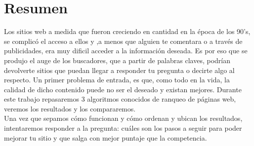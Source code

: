 \section{Resumen}

Los sitios web a medida que fueron creciendo en cantidad en la época de los 90's, se complicó el acceso a ellos y ,a menos que alguien te comentara o a través de publicidades, era muy dificil acceder a la información deseada. Es por eso que se produjo el auge de los buscadores, que a partir de palabras claves, podrían devolverte sitios que  puedan llegar a responder tu pregunta o decirte algo al respecto. 
Un primer problema de entrada, es que, como todo en la vida, la calidad de dicho contenido puede no ser el deseado y existan mejores. Durante este trabajo repasaremos 3 algoritmos conocidos de ranqueo de páginas web, veremos los resultados y los compararemos. \\
Una vez que sepamos cómo funcionan y cómo ordenan y ubican los resultados, intentaremos responder a la pregunta: cuáles son los pasos a seguir para poder mejorar tu sitio y que salga con mejor puntaje que la competencia.

